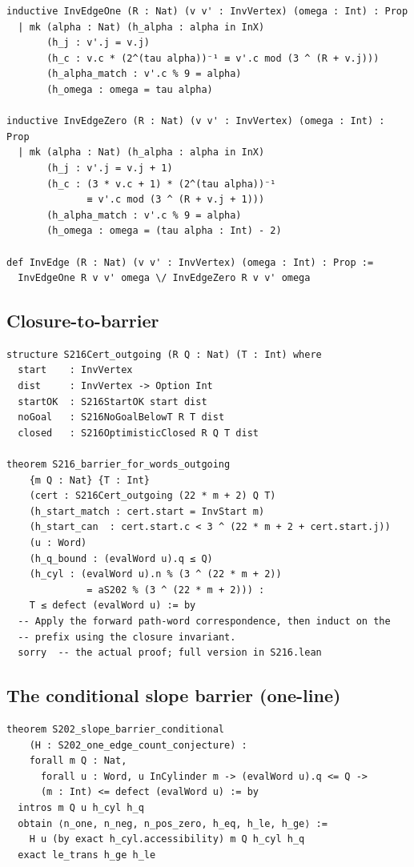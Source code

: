 \documentclass[11pt,a4paper]{article}
\theoremstyle{plain}
\theoremstyle{definition}
\begin{document}
\begin{lstlisting}
inductive InvEdgeOne (R : Nat) (v v' : InvVertex) (omega : Int) : Prop
  | mk (alpha : Nat) (h_alpha : alpha in InX)
       (h_j : v'.j = v.j)
       (h_c : v.c * (2^(tau alpha))⁻¹ ≡ v'.c mod (3 ^ (R + v.j)))
       (h_alpha_match : v'.c % 9 = alpha)
       (h_omega : omega = tau alpha)

inductive InvEdgeZero (R : Nat) (v v' : InvVertex) (omega : Int) : Prop
  | mk (alpha : Nat) (h_alpha : alpha in InX)
       (h_j : v'.j = v.j + 1)
       (h_c : (3 * v.c + 1) * (2^(tau alpha))⁻¹
              ≡ v'.c mod (3 ^ (R + v.j + 1)))
       (h_alpha_match : v'.c % 9 = alpha)
       (h_omega : omega = (tau alpha : Int) - 2)

def InvEdge (R : Nat) (v v' : InvVertex) (omega : Int) : Prop :=
  InvEdgeOne R v v' omega \/ InvEdgeZero R v v' omega
\end{lstlisting}

\subsection*{Closure-to-barrier}

\begin{lstlisting}
structure S216Cert_outgoing (R Q : Nat) (T : Int) where
  start    : InvVertex
  dist     : InvVertex -> Option Int
  startOK  : S216StartOK start dist
  noGoal   : S216NoGoalBelowT R T dist
  closed   : S216OptimisticClosed R Q T dist

theorem S216_barrier_for_words_outgoing
    {m Q : Nat} {T : Int}
    (cert : S216Cert_outgoing (22 * m + 2) Q T)
    (h_start_match : cert.start = InvStart m)
    (h_start_can  : cert.start.c < 3 ^ (22 * m + 2 + cert.start.j))
    (u : Word)
    (h_q_bound : (evalWord u).q ≤ Q)
    (h_cyl : (evalWord u).n % (3 ^ (22 * m + 2))
              = aS202 % (3 ^ (22 * m + 2))) :
    T ≤ defect (evalWord u) := by
  -- Apply the forward path-word correspondence, then induct on the
  -- prefix using the closure invariant.
  sorry  -- the actual proof; full version in S216.lean
\end{lstlisting}

\subsection*{The conditional slope barrier (one-line)}

\begin{lstlisting}
theorem S202_slope_barrier_conditional
    (H : S202_one_edge_count_conjecture) :
    forall m Q : Nat,
      forall u : Word, u InCylinder m -> (evalWord u).q <= Q ->
      (m : Int) <= defect (evalWord u) := by
  intros m Q u h_cyl h_q
  obtain ⟨n_one, n_neg, n_pos_zero, h_eq, h_le, h_ge⟩ :=
    H u (by exact h_cyl.accessibility) m Q h_cyl h_q
  exact le_trans h_ge h_le
\end{lstlisting}
\end{document}
